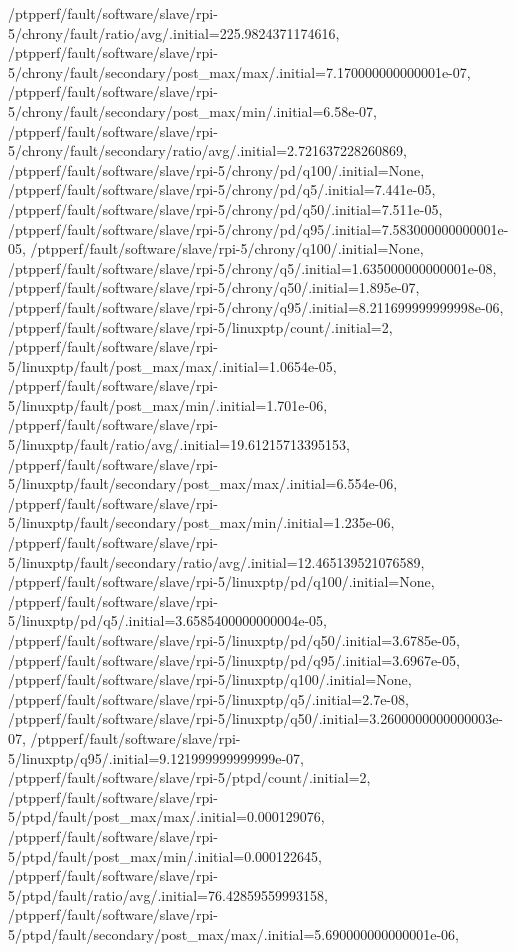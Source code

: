 {    /ptpperf/fault/software/slave/rpi-5/chrony/fault/ratio/avg/.initial=225.9824371174616,
    /ptpperf/fault/software/slave/rpi-5/chrony/fault/secondary/post_max/max/.initial=7.170000000000001e-07,
    /ptpperf/fault/software/slave/rpi-5/chrony/fault/secondary/post_max/min/.initial=6.58e-07,
    /ptpperf/fault/software/slave/rpi-5/chrony/fault/secondary/ratio/avg/.initial=2.721637228260869,
    /ptpperf/fault/software/slave/rpi-5/chrony/pd/q100/.initial=None,
    /ptpperf/fault/software/slave/rpi-5/chrony/pd/q5/.initial=7.441e-05,
    /ptpperf/fault/software/slave/rpi-5/chrony/pd/q50/.initial=7.511e-05,
    /ptpperf/fault/software/slave/rpi-5/chrony/pd/q95/.initial=7.583000000000001e-05,
    /ptpperf/fault/software/slave/rpi-5/chrony/q100/.initial=None,
    /ptpperf/fault/software/slave/rpi-5/chrony/q5/.initial=1.635000000000001e-08,
    /ptpperf/fault/software/slave/rpi-5/chrony/q50/.initial=1.895e-07,
    /ptpperf/fault/software/slave/rpi-5/chrony/q95/.initial=8.211699999999998e-06,
    /ptpperf/fault/software/slave/rpi-5/linuxptp/count/.initial=2,
    /ptpperf/fault/software/slave/rpi-5/linuxptp/fault/post_max/max/.initial=1.0654e-05,
    /ptpperf/fault/software/slave/rpi-5/linuxptp/fault/post_max/min/.initial=1.701e-06,
    /ptpperf/fault/software/slave/rpi-5/linuxptp/fault/ratio/avg/.initial=19.61215713395153,
    /ptpperf/fault/software/slave/rpi-5/linuxptp/fault/secondary/post_max/max/.initial=6.554e-06,
    /ptpperf/fault/software/slave/rpi-5/linuxptp/fault/secondary/post_max/min/.initial=1.235e-06,
    /ptpperf/fault/software/slave/rpi-5/linuxptp/fault/secondary/ratio/avg/.initial=12.465139521076589,
    /ptpperf/fault/software/slave/rpi-5/linuxptp/pd/q100/.initial=None,
    /ptpperf/fault/software/slave/rpi-5/linuxptp/pd/q5/.initial=3.6585400000000004e-05,
    /ptpperf/fault/software/slave/rpi-5/linuxptp/pd/q50/.initial=3.6785e-05,
    /ptpperf/fault/software/slave/rpi-5/linuxptp/pd/q95/.initial=3.6967e-05,
    /ptpperf/fault/software/slave/rpi-5/linuxptp/q100/.initial=None,
    /ptpperf/fault/software/slave/rpi-5/linuxptp/q5/.initial=2.7e-08,
    /ptpperf/fault/software/slave/rpi-5/linuxptp/q50/.initial=3.2600000000000003e-07,
    /ptpperf/fault/software/slave/rpi-5/linuxptp/q95/.initial=9.121999999999999e-07,
    /ptpperf/fault/software/slave/rpi-5/ptpd/count/.initial=2,
    /ptpperf/fault/software/slave/rpi-5/ptpd/fault/post_max/max/.initial=0.000129076,
    /ptpperf/fault/software/slave/rpi-5/ptpd/fault/post_max/min/.initial=0.000122645,
    /ptpperf/fault/software/slave/rpi-5/ptpd/fault/ratio/avg/.initial=76.42859559993158,
    /ptpperf/fault/software/slave/rpi-5/ptpd/fault/secondary/post_max/max/.initial=5.690000000000001e-06,
}
